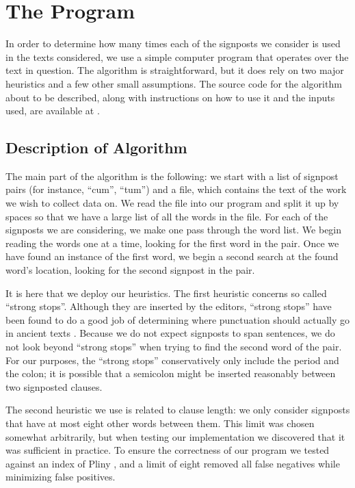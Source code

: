 \section{The Program}
\label{sec:The Program}

In order to determine how many times each of the signposts we consider is used in the texts considered, we use a simple computer program that operates over the text in question. The algorithm is straightforward, but it does rely on two major heuristics and a few other small assumptions. The source code for the algorithm about to be described, along with instructions on how to use it and the inputs used, are available at \cite{github}.

\subsection{Description of Algorithm}

The main part of the algorithm is the following: we start with a list of signpost pairs (for instance, ``cum'', ``tum'') and a file, which contains the text of the work we wish to collect data on. We read the file into our program and split it up by spaces so that we have a large list of all the words in the file. For each of the signposts we are considering, we make one pass through the word list. We begin reading the words one at a time, looking for the first word in the pair. Once we have found an instance of the first word, we begin a second search at the found word's location, looking for the second signpost in the pair.

It is here that we deploy our heuristics. The first heuristic concerns so called ``strong stops''. Although they are inserted by the editors, ``strong stops'' have been found to do a good job of determining where punctuation should actually go in ancient texts \cite{strongstop}. Because we do not expect signposts to span sentences, we do not look beyond ``strong stops'' when trying to find the second word of the pair. For our purposes, the ``strong stops'' conservatively only include the period and the colon; it is possible that a semicolon might be inserted reasonably between two signposted clauses.

The second heuristic we use is related to clause length: we only consider signposts that have at most eight other words between them. This limit was chosen somewhat arbitrarily, but when testing our implementation we discovered that it was sufficient in practice. To ensure the correctness of our program we tested against an index of Pliny \cite{index}, and a limit of eight removed all false negatives while minimizing false positives.

